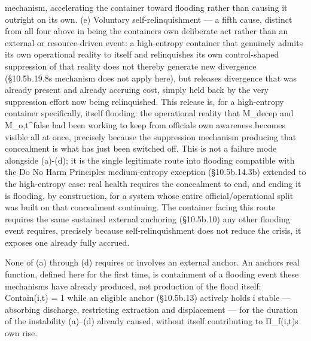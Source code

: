\documentclass[
]{article}
\begin{document}
mechanism, accelerating the container toward flooding rather than
causing it outright on its own. (e) Voluntary self-relinquishment --- a
fifth cause, distinct from all four above in being the containers own
deliberate act rather than an external or resource-driven event: a
high-entropy container that genuinely admits its own operational reality
to itself and relinquishes its own control-shaped suppression of that
reality does not thereby generate new divergence (§10.5b.19.8s mechanism
does not apply here), but releases divergence that was already present
and already accruing cost, simply held back by the very suppression
effort now being relinquished. This release is, for a high-entropy
container specifically, itself flooding: the operational reality that
M\_decep and M\_o,t\^{}false had been working to keep from officials own
awareness becomes visible all at once, precisely because the suppression
mechanism producing that concealment is what has just been switched off.
This is not a failure mode alongside (a)-(d); it is the single
legitimate route into flooding compatible with the Do No Harm Principles
medium-entropy exception (§10.5b.14.3b) extended to the high-entropy
case: real health requires the concealment to end, and ending it is
flooding, by construction, for a system whose entire
official/operational split was built on that concealment continuing. The
container facing this route requires the same sustained external
anchoring (§10.5b.10) any other flooding event requires, precisely
because self-relinquishment does not reduce the crisis, it exposes one
already fully accrued.

None of (a) through (d) requires or involves an external anchor. An
anchors real function, defined here for the first time, is containment
of a flooding event these mechanisms have already produced, not
production of the flood itself: Contain(i,t) = 1 while an eligible
anchor (§10.5b.13) actively holds i stable --- absorbing discharge,
restricting extraction and displacement --- for the duration of the
instability (a)--(d) already caused, without itself contributing to
Π\_f(i,t)s own rise.
\end{document}
